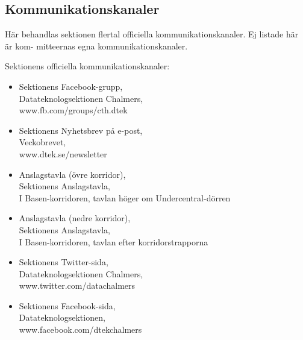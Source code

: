 \subsection{Kommunikationskanaler}
Här behandlas sektionen flertal officiella kommunikationskanaler. Ej listade här är kom-
mitteernas egna kommunikationskanaler.

Sektionens officiella kommunikationskanaler:
\begin{itemize}
    \item Sektionens Facebook-grupp,\\
Datateknologsektionen Chalmers,\\
www.fb.com/groups/cth.dtek
    \item Sektionens Nyhetsbrev på e-post,\\
Veckobrevet,\\
www.dtek.se/newsletter
    \item Anslagstavla (övre korridor),\\
Sektionens Anslagstavla,\\
I Basen-korridoren, tavlan höger om Undercentral-dörren
    
    \item Anslagstavla (nedre korridor),\\
Sektionens Anslagstavla,\\
I Basen-korridoren, tavlan efter korridorstrapporna
    \item Sektionens Twitter-sida,\\
Datateknologsektionen Chalmers,\\
www.twitter.com/datachalmers
    \item Sektionens Facebook-sida,\\
Datateknologsektionen,\\
www.facebook.com/dtekchalmers

\end{itemize}